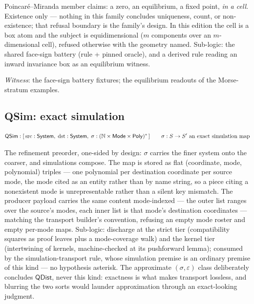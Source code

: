 Poincar\'e--Miranda member claims: a zero, an equilibrium, a fixed
point, \emph{in a cell}. Existence only --- nothing in this family
concludes uniqueness, count, or non-existence; that refusal boundary
is the family's design. In this edition the cell is a box atom and
the subject is equidimensional ($m$ components over an
$m$-dimensional cell), refused otherwise with the geometry named.
Sub-logic: the shared face-sign battery (rule + pinned oracle), and
a derived rule reading an inward invariance box as an equilibrium
witness.

\emph{Witness}: the face-sign battery fixtures; the equilibrium
readouts of the Morse-stratum examples.



\subsection{QSim: exact simulation}
\label{sec:spec-lang-qsim}

\[
\mathsf{QSim} : [\, \mathrm{src} : \mathsf{System},\;
  \mathrm{dst} : \mathsf{System},\;
  \sigma : (\mathbb{N} \times \mathsf{Mode} \times \mathsf{Poly})^{*} \,]
\qquad
\sigma : S \to S' \text{ an exact simulation map}
\]

The refinement preorder, one-sided by design: $\sigma$ carries the
finer system onto the coarser, and simulations compose. The map is
stored as flat (coordinate, mode, polynomial) triples --- one
polynomial per destination coordinate per source mode, the mode
cited as an entity rather than by name string, so a piece citing a
nonexistent mode is unrepresentable rather than a silent key
mismatch. The producer payload carries the same content
mode-indexed --- the outer list ranges over the source's modes, each
inner list is that mode's destination coordinates --- matching the
transport builder's convention, refusing an empty mode roster and
empty per-mode maps. Sub-logic:
discharge at the strict tier (compatibility squares as proof leaves
plus a mode-coverage walk) and the kernel tier (intertwining of
kernels, machine-checked at its pushforward lemma); consumed by the
simulation-transport rule, whose simulation premise is an ordinary
premise of this kind --- no hypothesis asterisk. The approximate
$(\sigma, \varepsilon)$ class deliberately concludes
$\mathsf{QDist}$, never this kind: exactness is what makes transport
lossless, and blurring the two sorts would launder approximation
through an exact-looking judgment.

